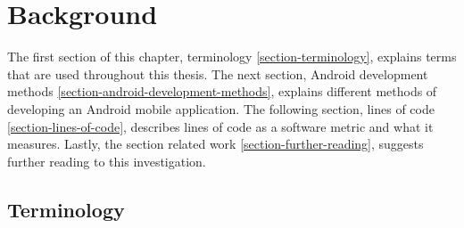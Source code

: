 \chapter{Background}\label{ch:background}
The first section of this chapter, terminology \ref{section-terminology}, explains terms that are used throughout this thesis. The next section, Android development methods \ref{section-android-development-methods}, explains different methods of developing an Android mobile application. The following section, lines of code \ref{section-lines-of-code}, describes lines of code as a software metric and what it measures. Lastly, the section related work \ref{section-further-reading}, suggests further reading to this investigation. 



\section{Terminology}\label{sec:terminology}
